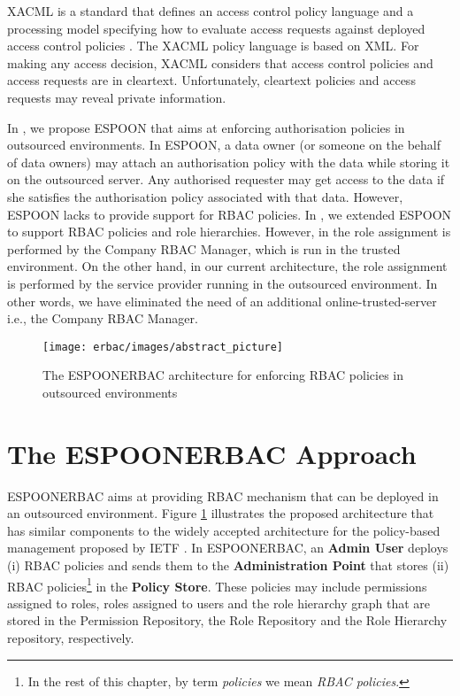 \documentclass[epsfig,a4paper,11pt,titlepage]{book}
\numberwithin{algorithm}{chapter}
\begin{document}
\gls{XACML} is a standard that defines an access control policy language and a processing model specifying how to evaluate access requests against deployed access control policies \cite{Godik:2002, Yavatkar:2000}. The \gls{XACML} policy language is based on \gls{XML}. For making any access decision, \gls{XACML} considers that access control policies and access requests are in cleartext. Unfortunately, cleartext policies and access requests may reveal private information.

In \cite{Asghar2011-ARES}, we propose \gls{ESPOON} that aims at enforcing authorisation policies in outsourced environments. In \gls{ESPOON}, a data owner (or someone on the behalf of data owners) may attach an authorisation policy with the data while storing it on the outsourced server. Any authorised requester may get access to the data if she satisfies the authorisation policy associated with that data. However, \gls{ESPOON} lacks to provide support for \gls{RBAC} policies. In \cite{Asghar2011-CCS}, we extended \gls{ESPOON} to support \gls{RBAC} policies and role hierarchies. However, in \cite{Asghar2011-CCS} the role assignment is performed by the Company \gls{RBAC} Manager, which is run in the trusted environment. On the other hand, in our current architecture, the role assignment is performed by the service provider running in the outsourced environment. In other words, we have eliminated the need of an additional online-trusted-server i.e., the Company \gls{RBAC} Manager.


\begin{figure} [htp]
\centering
\texttt{[image: erbac/images/abstract\_picture]}
\caption[The proposed architecture for enforcing RBAC policies]{The \gls{ESPOONERBAC} architecture for enforcing RBAC policies in outsourced environments}
\label{fig:erbac-abstract_picture}
\end{figure}

\section[The ESPOON Approach]{The \acrshort{ESPOONERBAC} Approach}
\label{sec:erbac-approach}

\gls{ESPOONERBAC} aims at providing \gls{RBAC} mechanism that can be deployed in an outsourced environment. Figure \ref{fig:erbac-abstract_picture} illustrates the proposed architecture that has similar components to the widely accepted architecture for the policy-based management proposed by \gls{IETF} \cite{Yavatkar:2000}. In \gls{ESPOONERBAC}, an \textbf{Admin User} deploys (i) \gls{RBAC} policies and sends them to the \textbf{Administration Point} that stores (ii) \gls{RBAC} policies\footnote{In the rest of this chapter, by term \emph{policies} we mean \emph{\gls{RBAC} policies}.} in the \textbf{Policy Store}. These policies may include permissions assigned to roles, roles assigned to users and the role hierarchy graph that are stored in the Permission Repository, the Role Repository and the Role Hierarchy repository, respectively. 
\end{document}
